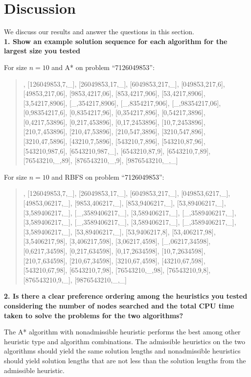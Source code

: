 \section{Discussion}\label{sec:dis}

We discuss our results and answer the questions in this section.\\

\textbf{1. Show an example solution sequence for each algorithm for the largest size you tested}

For size $n = 10$ and A* on problem ``7126049853'':

\begin{quote}
\noindent
[7126049853,\_,\_], [126049853,7,\_], [26049853,17,\_], [6049853,217,\_],
[049853,217,6], [49853,217,06], [9853,4217,06], [853,4217,906],
[53,4217,8906], [3,54217,8906], [\_,354217,8906], [\_,8354217,906],
[\_,98354217,06], [0,98354217,6], [0,8354217,96], [0,354217,896],
[0,54217,3896], [0,4217,53896], [0,217,453896], [0,17,2453896],
[10,7,2453896], [210,7,453896], [210,47,53896], [210,547,3896],
[3210,547,896], [3210,47,5896], [43210,7,5896], [543210,7,896],
[543210,87,96], [543210,987,6], [6543210,987,\_], [6543210,87,9],
[6543210,7,89], [76543210,\_,89], [876543210,\_,9], [9876543210,\_,\_]
\end{quote}

For size $n = 10$ and RBFS on problem ``7126049853'':

\begin{quote}
\noindent
[7126049853,\_,\_], [126049853,7,\_], [26049853,17,\_], [6049853,217,\_], 
[049853,6217,\_], [49853,06217,\_], [9853,406217,\_], [853,9406217,\_], 
[53,89406217,\_], [3,589406217,\_], [\_,3589406217,\_], [3,589406217,\_], 
[\_,3589406217,\_], [3,589406217,\_], [\_,3589406217,\_], [3,589406217,\_], 
[\_,3589406217,\_], [3,589406217,\_], [53,89406217,\_], [53,9406217,8], 
[53,406217,98], [3,5406217,98], [3,406217,598], [3,06217,4598], 
[\_,06217,34598], [0,6217,34598], [0,217,634598], [0,17,2634598], 
[10,7,2634598], [210,7,634598], [210,67,34598], [3210,67,4598], 
[43210,67,598], [543210,67,98], [6543210,7,98], [76543210,\_,98], 
[76543210,9,8], [876543210,9,\_], [9876543210,\_,\_] 
\end{quote}

\textbf{2. Is there a clear preference ordering among the heuristics you tested considering the number of nodes searched and the total CPU time taken to solve the problems for the two algorithms?}

The A* algorithm with nonadmissible heuristic performs the best among other heuristic type and algorithm combinations. The admissible heuristics on the two algorithms should yield the same solution lengths and nonadmissible heuristics should yield solution lengths that are not less than the solution lengths from the admissible heuristic.\\

